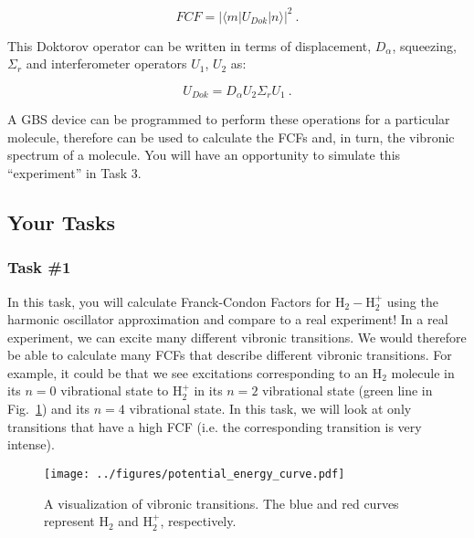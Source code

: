 \documentclass[12pt]{article}
\begin{document}
\begin{equation}
FCF=|\langle m|U_{Dok}|n\rangle|^2    ~.
\end{equation}

This Doktorov operator can be written in terms of displacement, $D_\alpha$, squeezing,$\Sigma_r$ and interferometer operators $U_1$, $U_2$ as\cite{killoran2019strawberry, bromley2020applications}:

\begin{equation}
U_{Dok}=D_\alpha U_2 \Sigma_r U_1    ~.
\end{equation}

A GBS device can be programmed to perform these operations for a particular molecule, therefore can be used to calculate the FCFs and, in turn, the vibronic spectrum of a molecule. You will have an opportunity to simulate this ``experiment'' in Task 3. 
\newpage

\subsection*{Your Tasks}

\subsubsection*{Task \#1}

In this task, you will calculate Franck-Condon Factors for H$_2-$H$_2^+$ using the harmonic oscillator approximation and compare to a real experiment! In a real experiment, we can excite many different vibronic transitions. We would therefore be able to calculate many FCFs that describe different vibronic transitions. For example, it could be that we see excitations corresponding to an H$_2$ molecule in its $n = 0$ vibrational state to H$_2^+$ in its $n = 2$ vibrational state (green line in Fig.~\ref{fig:visualize_vibronic}) and its $n = 4$ vibrational state. In this task, we will look at only transitions that have a high FCF (i.e. the corresponding transition is very intense).

\begin{figure} 
    \begin{center}
        \texttt{[image: ../figures/potential\_energy\_curve.pdf]}
    \end{center}
    \caption{A visualization of vibronic transitions. The blue and red curves represent H$_2$ and H$_2^+$, respectively.}
        \label{fig:visualize_vibronic}
\end{figure}
\end{document}
